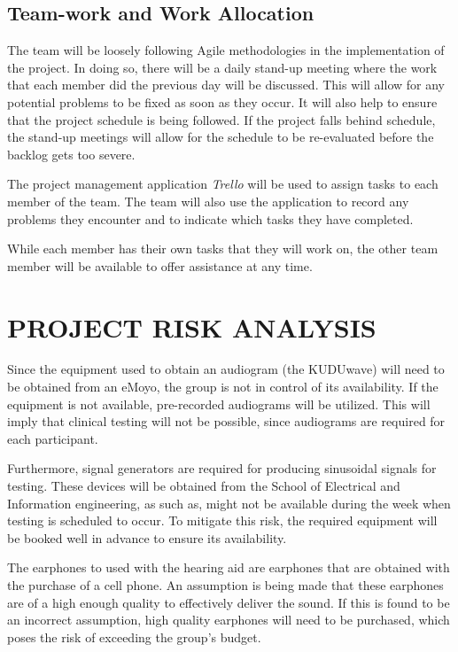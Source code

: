 \documentclass[10pt,twocolumn]{witseiepaper}
\begin{document}
\subsection{Team-work and Work Allocation}

The team will be loosely following Agile methodologies in the implementation of the project. In doing so, there will be a daily stand-up meeting where the work that each member did the previous day will be discussed. This will allow for any potential problems to be fixed as soon as they occur. It will also help to ensure that the project schedule is being followed. If the project falls behind schedule, the stand-up meetings will allow for the schedule to be re-evaluated before the backlog gets too severe.

The project management application \textit{Trello} will be used to assign tasks to each member of the team. The team will also use the application to record any problems they encounter and to indicate which tasks they have completed. 

While each member has their own tasks that they will work on, the other team member will be available to offer assistance at any time.

\section{PROJECT RISK ANALYSIS}

Since the equipment used to obtain an audiogram (the KUDUwave) will need to be obtained from an eMoyo, the group is not in control of its availability. If the equipment is not available, pre-recorded audiograms will be utilized. This will imply that clinical testing will not be possible, since audiograms are required for each participant.

Furthermore, signal generators are required for producing sinusoidal signals for testing. These devices will be obtained from the School of Electrical and Information engineering, as such as, might not be available during the week when testing is scheduled to occur. To mitigate this risk, the required equipment will be booked well in advance to ensure its availability.

The earphones to used with the hearing aid are earphones that are obtained with the purchase of a cell phone. An assumption is being made that these earphones are of a high enough quality to effectively deliver the sound. If this is found to be an incorrect assumption, high quality earphones will need to be purchased, which poses the risk of exceeding the group's budget.
\end{document}
